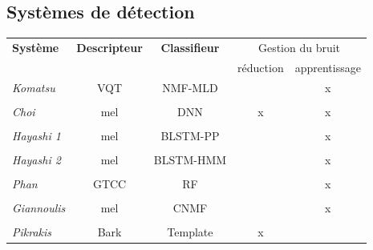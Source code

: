 \subsection{Systèmes de détection}

\begin{table}[t]
\begin{center}
\scriptsize
\begin{tabular}{lcccc}
\textbf{Système}             & \textbf{Descripteur}         & \textbf{Classifieur} &   \multicolumn{2}{c}{Gestion du bruit} \\ 
                             &                              &                      & réduction & apprentissage   \\ 
\hline
\emph{Komatsu}               &     VQT                      & NMF-MLD              &           & x \\ 
\citep{Komatsu2016}          &                              &                      &           &   \\ 
\hline
\emph{Choi}                  &     mel                      & DNN                  & x         & x \\ 
\citep{Choi2016}             &                              &                      &           & \\ 
\hline
\emph{Hayashi 1}             &     mel                      & BLSTM-PP             &           & x \\ 
\citep{Hayashi2016}          &                              &                      &           & \\ 
\hline
\emph{Hayashi 2}             &     mel                      & BLSTM-HMM            &           & x \\ 
\citep{Hayashi2016}          &                              &                      &           & \\ 
\hline
\emph{Phan}                  &     GTCC                     & RF                   &           & x\\ 
\citep{Phan2016}             &                              &                      &           & \\ 
\hline
\emph{Giannoulis}            &     mel                      & CNMF                 &           & x\\ 
\citep{Giannoulis2016}       &                              &                      &           & \\ 
\hline
\emph{Pikrakis}              &     Bark                     & Template             & x         & \\ 

\end{tabular}
\end{center}
\end{table}
